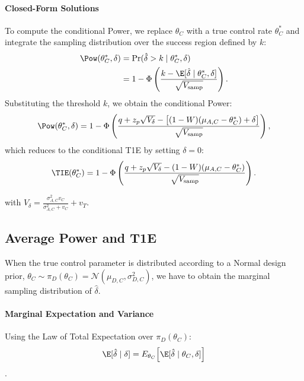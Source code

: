 \paragraph{Closed-Form Solutions}
To compute the conditional Power, we replace $\theta_C$ with a true control rate $\theta_C^*$ and integrate the sampling distribution over the success region defined by $k$:
\begin{align*}
    \Pow(\theta_C^*, \delta) &= \Pr(\hat{\delta} > k \mid \theta_C^*, \delta) \\
    &= 1 - \Phi\left( \frac{k - \E[\hat{\delta} \mid \theta_C^*, \delta]}{\sqrt{V_{\text{samp}}}} \right). 
\end{align*}
Substituting the threshold $k$, we obtain the conditional Power:
\begin{equation} \label{eq:app_power_closed_form}
    \Pow(\theta_C^*, \delta) = 1 - \Phi\left( \frac{q + z_p \sqrt{V_{\delta}} - \big[(1 - W)(\mu_{A,C} - \theta_C^*) + \delta\big]}{\sqrt{V_{\text{samp}}}} \right),
\end{equation}
which reduces to the conditional T1E by setting $\delta = 0$: 
\begin{equation} \label{eq:app_t1e_closed_form}
    \TIE(\theta_C^*) = 1 - \Phi\left( \frac{q + z_p \sqrt{V_{\delta}} - (1 - W)(\mu_{A,C} - \theta_C^*)}{\sqrt{V_{\text{samp}}}} \right). 
\end{equation}

with $V_{\delta} = \frac{\sigma_{A,C}^2 v_C}{\sigma_{A,C}^2 + v_C} + v_T$.


\subsection{Average Power and T1E}
\label{sec:avgmetrics}
When the true control parameter is distributed according to a Normal design prior, $\theta_C \sim \pi_D(\theta_C) = \mathcal{N}(\mu_{D,C}, \sigma_{D,C}^2)$, we have to obtain the marginal sampling distribution of $\hat{\delta}$.

\paragraph{Marginal Expectation and Variance}
Using the Law of Total Expectation over $\pi_D(\theta_C)$:
    $$\E[\hat{\delta} \mid \delta] = E_{\theta_C} \Big[ \E[\hat{\delta} \mid \theta_C, \delta] \Big] $$.

